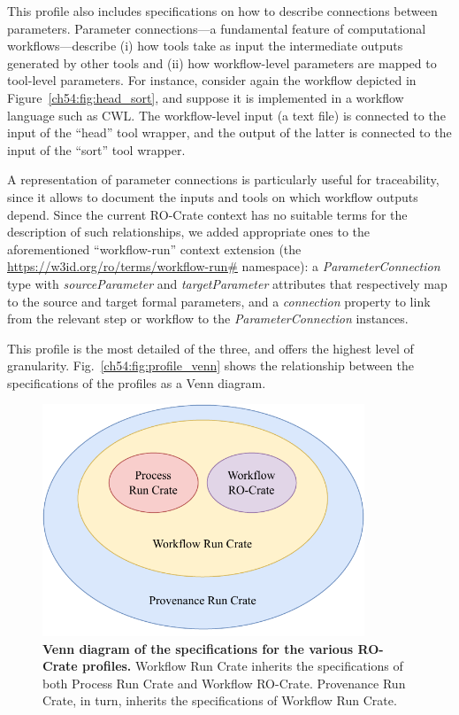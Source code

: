 This profile also includes specifications on how to describe connections between parameters.
Parameter connections---a fundamental feature of computational workflows---describe (i) how tools take as input the intermediate outputs generated by other tools and (ii) how workflow-level parameters are mapped to tool-level parameters.
For instance, consider again the workflow depicted in Figure~\vref{ch54:fig:head_sort},
and suppose it is implemented in a workflow language such as CWL. The workflow-level input (a text file) is connected to the input of the “head” tool wrapper, and the output of the latter is connected to the input of the “sort” tool wrapper.


A representation of parameter connections is particularly useful for traceability, since it allows to document the inputs and tools on which workflow outputs depend.
Since the current RO-Crate context has no suitable terms for the description of such relationships, 
we added appropriate ones to the aforementioned  ``workflow-run'' context extension (the \url{https://w3id.org/ro/terms/workflow-run\#} namespace):
a \emph{ParameterConnection} type with
\emph{sourceParameter} and \emph{targetParameter} attributes that respectively map to the source and target formal parameters, and a
\emph{connection} property to link from the relevant step or workflow to the \emph{ParameterConnection} instances.

This profile is the most detailed of the three, and offers the highest level of granularity. Fig.~\vref{ch54:fig:profile_venn} shows the relationship between the specifications of the profiles as a Venn diagram.

\begin{figure}[htp]
  \includegraphics[width=26em]{figures/ch54/wrroc-venn.drawio.pdf}
  \caption[Venn diagram of the specifications for the various RO-Crate profiles]{{\bf Venn diagram of the specifications for the various RO-Crate profiles.}
  Workflow Run Crate inherits the specifications of both Process Run Crate and Workflow RO-Crate. Provenance Run Crate, in turn, inherits the specifications of Workflow Run Crate.}
  \label{ch54:fig:profile_venn}
  \end{figure}


